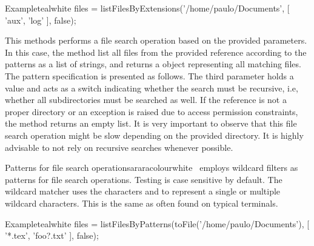 \begin{description}
\begin{codebox}{Example}{teal}{\icnote}{white}
files = listFilesByExtensions('/home/paulo/Documents',
        [ 'aux', 'log' ], false);
\end{codebox}

\item[\mdbox{R}{\parbox{0.59\textwidth}{listFilesByPatterns(File file,\\\hspace*{1em} List<String> patterns, boolean recursive)}}{List<File>}] This methods performs a file search operation based on the provided parameters. In this case, the method list all files from the provided  reference according to the  patterns as a list of strings, and returns a  object representing all matching files. The pattern specification is presented as follows. The third parameter holds a  value and acts as a switch indicating whether the search must be recursive, i.e, whether all subdirectories must be searched as well. If the reference is not a proper directory or an exception is raised due to access permission constraints, the  method returns an empty list. It is very important to observe that this file search operation might be slow depending on the provided directory. It is highly advisable to not rely on recursive searches whenever possible.

\begin{messagebox}{Patterns for file search operations}{araracolour}{\icattention}{white}
\arara\ employs wildcard filters as patterns for file search operations. Testing is case sensitive by default. The wildcard matcher uses the characters  and \rbox[araracolour]{*} to represent a single or multiple wildcard characters. This is the same as often found on typical terminals.
\end{messagebox}

\begin{codebox}{Example}{teal}{\icnote}{white}
files = listFilesByPatterns(toFile('/home/paulo/Documents'),
        [ '*.tex', 'foo?.txt' ], false);
\end{codebox}



\end{description}

